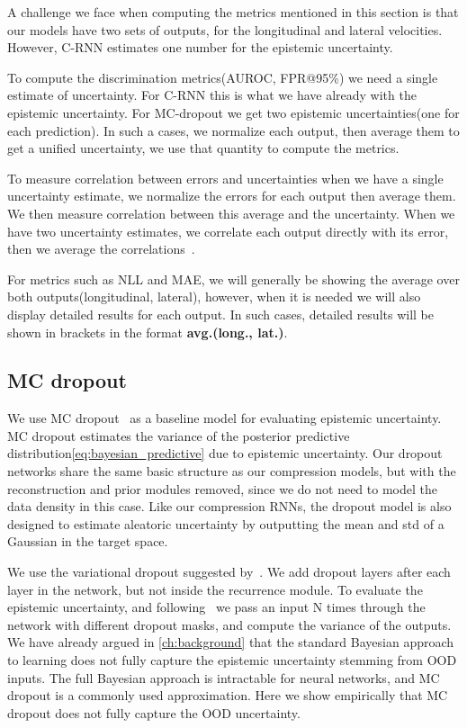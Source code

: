 \documentclass[../main.tex]{subfiles}
\begin{document}
A challenge we face when computing the metrics mentioned in this section is that our models have two sets of outputs, for the longitudinal and lateral velocities. However, C-RNN estimates one number for the epistemic uncertainty.

To compute the discrimination metrics(AUROC, FPR@95\%) we need a single estimate of uncertainty. For C-RNN this is what we have already with the epistemic uncertainty. For MC-dropout we get two epistemic uncertainties(one for each prediction). In such a cases, we normalize each output, then average them to get a unified uncertainty, we use that quantity to compute the metrics.

To measure correlation between errors and uncertainties when we have a single uncertainty estimate, we normalize the errors for each output then average them. We then measure correlation between this average and the uncertainty. When we have two uncertainty estimates, we correlate each output directly with its error, then we average the correlations~\citep{alexander1990note}.

For metrics such as NLL and MAE, we will generally be showing the average over both outputs(longitudinal, lateral), however, when it is needed we will also display detailed results for each output. In such cases, detailed results will be shown in brackets in the format \textbf{avg.(long., lat.)}. 

\subsection{MC dropout}

We use MC dropout~\citep{gal2016dropout} as a baseline model for evaluating epistemic uncertainty. MC dropout estimates the variance of the posterior predictive distribution\cref{eq:bayesian_predictive} due to epistemic uncertainty. Our dropout networks share the same basic structure as our compression models, but with the reconstruction and prior modules removed, since we do not need to model the data density in this case. Like our compression RNNs, the dropout model is also designed to estimate aleatoric uncertainty by outputting the mean and std of a Gaussian in the target space.

We use the variational dropout suggested by~\cite{gal2016theoretically}. We add dropout layers after each layer in the network, but not inside the recurrence module. To evaluate the epistemic uncertainty, and following~\cite{gal2016dropout} we pass an input N times through the network with different dropout masks, and compute the variance of the outputs. We have already argued in \cref{ch:background} that the standard Bayesian approach to learning does not fully capture the epistemic uncertainty stemming from OOD inputs. The full Bayesian approach is intractable for neural networks, and MC dropout is a commonly used approximation. Here we show empirically that MC dropout does not fully capture the OOD uncertainty. 
\end{document}
